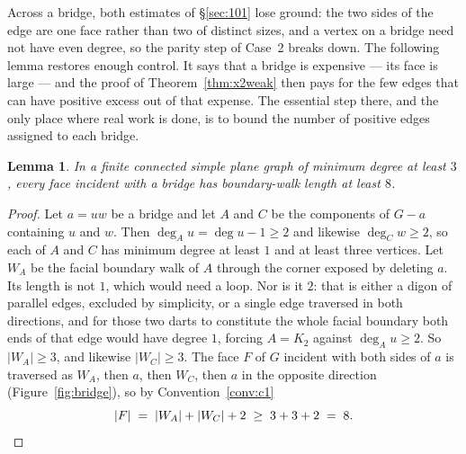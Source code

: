 \documentclass{baustms}
\theoremstyle{cupthm}
\newtheorem{lemma}[theorem]{Lemma}
\theoremstyle{cupdefn}
\theoremstyle{cuprem}
\begin{document}
Across a bridge, both estimates of \S\ref{sec:101} lose ground: the two sides of
the edge are one face rather than two of distinct sizes, and a vertex on a bridge
need not have even degree, so the parity step of Case~2 breaks down. The
following lemma restores enough control. It says that a bridge is expensive --- its face is large --- and the
proof of Theorem~\ref{thm:x2weak} then pays for the few edges that can have
positive excess out of that expense. The essential step there, and the only place
where real work is done, is to bound the number of positive edges assigned to
each bridge.

\begin{lemma}\label{lem:bridgeface}
In a finite connected simple plane graph of minimum degree at least $3$, every
face incident with a bridge has boundary-walk length at least $8$.
\end{lemma}

\begin{proof}
Let $a = uw$ be a bridge and let $A$ and $C$ be the components of $G-a$
containing $u$ and $w$. Then $\deg_A u = \deg u - 1 \ge 2$ and likewise
$\deg_C w \ge 2$, so each of $A$ and $C$ has minimum degree at least $1$ and at
least three vertices. Let $W_A$ be the facial boundary walk of $A$ through the
corner exposed by deleting $a$. Its length is not $1$, which would need a loop.
Nor is it $2$: that is either a digon of parallel edges, excluded by simplicity,
or a single edge traversed in both directions, and for those two darts to
constitute the whole facial boundary both ends of that edge would have degree
$1$, forcing $A = K_2$ against $\deg_A u \ge 2$. So $|W_A| \ge 3$, and likewise
$|W_C| \ge 3$. The face $F$ of $G$ incident with both sides of $a$ is traversed
as $W_A$, then $a$, then $W_C$, then $a$ in the opposite direction
(Figure~\ref{fig:bridge}), so by Convention~\ref{conv:c1}
\[
  |F| \;=\; |W_A| + |W_C| + 2 \;\ge\; 3 + 3 + 2 \;=\; 8 . \qedhere
\]
\end{proof}
\end{document}
